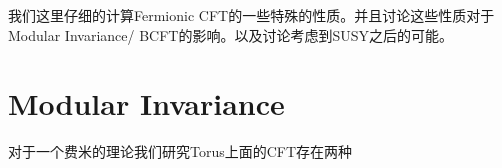 我们这里仔细的计算Fermionic CFT的一些特殊的性质。并且讨论这些性质对于Modular Invariance/ BCFT的影响。以及讨论考虑到SUSY之后的可能。


\section{Modular Invariance}
对于一个费米的理论我们研究Torus上面的CFT存在两种